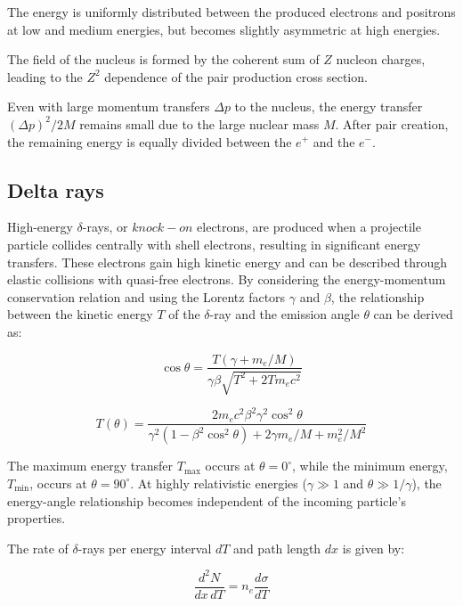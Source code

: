 The energy is uniformly distributed between the produced 
electrons and positrons at low and medium energies, but becomes 
slightly asymmetric at high energies.

The field of the nucleus is formed by the coherent sum of $Z$ 
nucleon charges, leading to the $Z^2$ dependence of the pair 
production cross section.

Even with large momentum transfers $\Delta p$ to the nucleus, 
the energy transfer $(\Delta p)^2/2M$ remains small due to the 
large nuclear mass $M$. After pair creation, the remaining 
energy is equally divided between the $e^+$ and the $e^-$.

\subsection{Delta rays}
High-energy $\delta$-rays, or $knock-on$ electrons, 
are produced when a projectile particle collides 
centrally with shell electrons, resulting in 
significant energy transfers. These electrons 
gain high kinetic energy and can be described 
through elastic collisions with quasi-free electrons. 
By considering the energy-momentum conservation relation 
and using the Lorentz factors $\gamma$ and $\beta$, the 
relationship between the kinetic energy $T$ of the 
$\delta$-ray and the emission angle $\theta$ can be derived as:

\begin{equation}
\cos \theta = \frac{T(\gamma + m_e / M)}{\gamma \beta \sqrt{T^2 + 2T m_e c^2}}
\end{equation}

\begin{equation}
T(\theta) = \frac{2 m_e c^2 \beta^2 \gamma^2 \cos^2 \theta}{\gamma^2(1 - \beta^2 \cos^2 \theta) + 2 \gamma m_e / M + m_e^2 / M^2}
\end{equation}

The maximum energy transfer $T_{\text{max}}$ occurs at $\theta = 0^\circ$, 
while the minimum energy, $T_{\text{min}}$, occurs at $\theta = 90^\circ$. 
At highly relativistic energies ($\gamma \gg 1$ and $\theta \gg 1/\gamma$), 
the energy-angle relationship becomes independent of the incoming particle's properties.

The rate of $\delta$-rays per energy interval $dT$ and path length $dx$ is given by:

\begin{equation}
\frac{d^2 N}{dx \, dT} = n_e \frac{d\sigma}{dT}
\end{equation}

